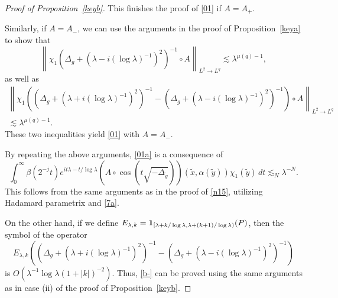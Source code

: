 \documentclass[10pt]{amsart}
\newcommand{\la}{\lambda}
\newcommand{\one}{{\bf 1}}
\newcommand{\1}{{\bf 1}}
\begin{document}
\begin{proof}[Proof of Proposition~\ref{keyb}]
This finishes the proof of \eqref{01} if $A=A_+$. 

Similarly, if  $A=A_-$, we can use the arguments in the proof of Proposition~\ref{keya} to show that 
\begin{equation}\label{01a}
    \left\|\chi_1\left(\Delta_g+(\la-i(\log\la)^{-1})^2\right)^{-1}\circ A\right\|_{L^2\to L^q}\lesssim \la^{\mu(q)-1},
\end{equation}
as well as 
\begin{multline}\label{b-}
\left\|\chi_1\left(\left(\Delta_g+(\la+i(\log\la)^{-1})^2\right)^{-1}-\left(\Delta_g+(\la-i(\log\la)^{-1})^2\right)^{-1}\right)\circ A\right\|_{L^2\to L^q}
\\
\lesssim \la^{\mu(q)-1}.
\end{multline}
These two inequalities yield \eqref{01} with $A=A_-$.

By repeating the above arguments, \eqref{01a} is a consequence of 
\begin{equation}\label{20b}
\int_0^\infty \beta(2^{-j}t)e^{it\la-t/\log\la}   (A\circ \cos (t\sqrt{-\Delta_{\tilde g}}))(\tilde x,\alpha(\tilde y))\chi_1(\tilde y)\,dt \lesssim_N \la^{-N}.
\end{equation}
This follows from the same arguments as in the proof of \eqref{n15},  utilizing Hadamard parametrix and \eqref{7a}.

On the other hand,
if we define
$E_{\la,k}=\one_{[\la+k/\log\la, \la +(k+1)/\log\la)}( P)$, then
the symbol of the operator
$$
E_{\la,k}\left(\left(\Delta_g+(\la+i(\log\la)^{-1})^2\right)^{-1}-\left(\Delta_g+(\la-i(\log\la)^{-1})^2\right)^{-1}\right)
$$
is $O\left(\la^{-1}\log\la (1+|k|)^{-2}\right )$. Thus, \eqref{b-} can be proved using the same arguments as in case (ii) of the proof of Proposition~\ref{keyb}.
\end{proof}








%
\end{document}

